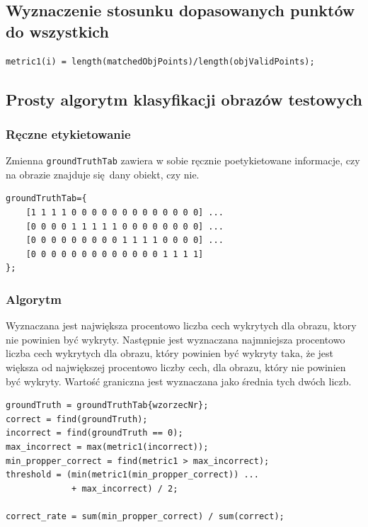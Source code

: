 \documentclass[a4paper, 12pt, titlepage]{article}
\begin{document}
        \subsection{Wyznaczenie stosunku dopasowanych punktów do wszystkich}
\begin{lstlisting}
metric1(i) = length(matchedObjPoints)/length(objValidPoints);
\end{lstlisting}
        \subsection{Prosty algorytm klasyfikacji obrazów testowych} 
            \subsubsection{Ręczne etykietowanie}
                Zmienna \texttt{groundTruthTab} zawiera w sobie ręcznie 
                poetykietowane informacje, czy na obrazie znajduje się dany
                obiekt, czy nie.
\begin{lstlisting}
groundTruthTab={
    [1 1 1 1 0 0 0 0 0 0 0 0 0 0 0 0 0] ...
    [0 0 0 0 1 1 1 1 1 0 0 0 0 0 0 0 0] ... 
    [0 0 0 0 0 0 0 0 0 1 1 1 1 0 0 0 0] ...
    [0 0 0 0 0 0 0 0 0 0 0 0 0 1 1 1 1]
};
\end{lstlisting}
            \subsubsection{Algorytm} 
                Wyznaczana jest największa procentowo liczba cech wykrytych
                dla obrazu, ktory nie powinien być wykryty. Następnie jest
                wyznaczana najmniejsza procentowo liczba cech wykrytych dla
                obrazu, który powinien być wykryty taka, że jest większa od
                największej procentowo liczby cech, dla obrazu, który nie
                powinien być wykryty. Wartość graniczna jest wyznaczana jako
                średnia tych dwóch liczb.
\begin{lstlisting}
groundTruth = groundTruthTab{wzorzecNr};
correct = find(groundTruth);
incorrect = find(groundTruth == 0);
max_incorrect = max(metric1(incorrect));
min_propper_correct = find(metric1 > max_incorrect);
threshold = (min(metric1(min_propper_correct)) ...
             + max_incorrect) / 2;

correct_rate = sum(min_propper_correct) / sum(correct);
\end{lstlisting}
\end{document}
